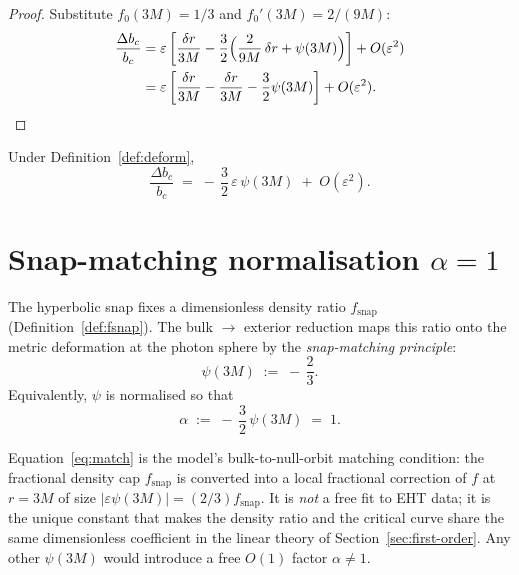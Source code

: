 \begin{proof}
Substitute \(f_0(3M)=1/3\) and \(f_0'(3M)=2/(9M)\):
\begin{align*}
\frac{\Delta b_c}{b_c}
&=
\varepsilon\left[
\frac{\delta r}{3M}
-\frac{3}{2}
\Bigl(\frac{2}{9M}\,\delta r+\psi(3M)\Bigr)
\right]
+O(\varepsilon^2)\\
&=
\varepsilon\left[
\frac{\delta r}{3M}
-\frac{\delta r}{3M}
-\frac{3}{2}\psi(3M)
\right]
+O(\varepsilon^2).
\end{align*}
\end{proof}

\begin{theorem}
\label{thm:master}
Under Definition~\ref{def:deform},
\begin{equation}
\boxed{
\frac{\Delta b_c}{b_c}
\;=\;
-\,\frac{3}{2}\,\varepsilon\,\psi(3M)
\;+\;O(\varepsilon^2).
}
\label{eq:master}
\end{equation}
\end{theorem}

\section{Snap-matching normalisation \(\alpha=1\)}
\label{sec:alpha}

\begin{definition}
\label{def:psi}
The hyperbolic snap fixes a dimensionless density ratio \(f_{\mathrm{snap}}\)
(Definition~\ref{def:fsnap}). The bulk \(\to\) exterior reduction maps this
ratio onto the metric deformation at the photon sphere by the
\emph{snap-matching principle}:
\begin{equation}
\label{eq:match}
\psi(3M)
\;:=\;
-\,\frac{2}{3}.
\end{equation}
Equivalently, \(\psi\) is normalised so that
\begin{equation}
\label{eq:alpha}
\alpha
\;:=\;
-\,\frac{3}{2}\,\psi(3M)
\;=\;1.
\end{equation}
\end{definition}

\begin{remark}[Physical content of \(\psi(3M)=-2/3\)]
Equation~\eqref{eq:match} is the model's bulk-to-null-orbit matching condition:
the fractional density cap \(f_{\mathrm{snap}}\) is converted into a local
fractional correction of \(f\) at \(r=3M\) of size
\(|\varepsilon\psi(3M)|=(2/3)f_{\mathrm{snap}}\). It is \emph{not} a free fit to EHT
data; it is the unique constant that makes the density ratio and the critical
curve share the same dimensionless coefficient in the linear theory of
Section~\ref{sec:first-order}. Any other \(\psi(3M)\) would introduce a free
\(O(1)\) factor \(\alpha\neq 1\).
\end{remark}

